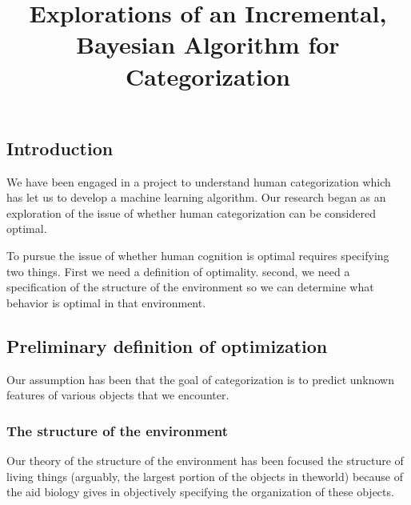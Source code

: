 \begin{article}


\setcounter{page}{275} %




\title{Explorations of an Incremental, Bayesian Algorithm
for Categorization}







\section{Introduction}
We have been engaged in a project to understand human categorization which
has let us to develop a machine learning algorithm. Our research began as an
exploration of the issue of whether human categorization can be considered
optimal.

To pursue the issue of whether human cognition is optimal requires
specifying two things. First we need a definition of optimality.
second, we need a specification of the structure of the environment
so we can determine what behavior is optimal in that environment.


\subsection{Preliminary definition of optimization}
Our assumption has been that the goal of categorization is to predict
unknown features of various objects that we encounter.

\subsubsection{The structure of the environment}
Our theory of the structure of the environment has been focused the
structure of living things (arguably, the largest portion of the
objects in theworld) because of the aid biology gives in objectively
specifying the organization of these objects.



\end{article}

